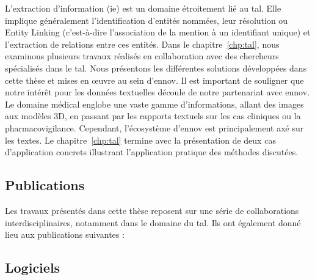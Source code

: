 \begin{description}
    L'extraction d'information (\acrshort{ie}) est un domaine étroitement lié au \gls{tal}.
    Elle implique généralement l'identification d'entités nommées, leur résolution ou Entity Linking (c'est-à-dire l'association de la mention à un identifiant unique) et l'extraction de relations entre ces entités.
    Dans le chapitre~\ref{chp:tal}, nous examinons plusieurs travaux réalisés en collaboration avec des chercheurs spécialisés dans le \gls{tal}.
    Nous présentons les différentes solutions développées dans cette thèse et mises en œuvre au sein d'\gls{ennov}.
    Il est important de souligner que notre intérêt pour les données textuelles découle de notre partenariat avec \gls{ennov}.
    Le domaine médical englobe une vaste gamme d'informations, allant des images aux modèles 3D, en passant par les rapports textuels sur les cas cliniques ou la pharmacovigilance.
    Cependant, l'écosystème d'\gls{ennov} est principalement axé sur les textes.
    Le chapitre~\ref{chp:tal} termine avec la présentation de deux cas d'application concrets illustrant l'application pratique des méthodes discutées.
\end{description}

\subsection{Publications}

Les travaux présentés dans cette thèse reposent sur une série de collaborations interdisciplinaires, notamment dans le domaine du \gls{tal}.
Ils ont également donné lieu aux publications suivantes :

\begin{bibunit}[alphaurl]
    \nocite{amaviNaturalLanguageQuerying2020}
    \nocite{chabinGraphRewritingRules2020}
    \nocite{minardDOINGDEFTCascade2020}
    \nocite{chabinGraphRewritingRules2021}
    \nocite{hiotDOINGDEFTUtilisation2021}
    \nocite{savaryRelationExtractionClinical2022}
    \nocite{chabinManagingLinkedNulls2023}

    \renewcommand{\bibname}{}
    \renewcommand{\section}[1]{}
\end{bibunit}

\subsection{Logiciels}

